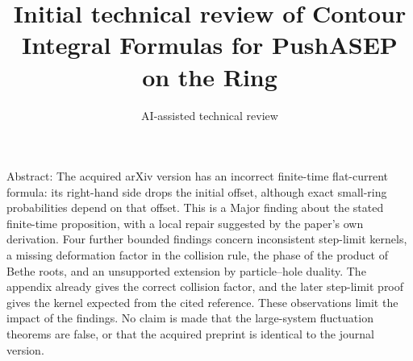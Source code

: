 \documentclass[10pt]{article}
\title{Initial technical review of
Contour Integral Formulas for PushASEP on the Ring}
\author{AI-assisted technical review}
\date{}
\begin{document}
\maketitle
Abstract: The acquired arXiv version has an incorrect finite-time flat-current formula: its right-hand side drops the initial offset, although exact small-ring probabilities depend on that offset. This is a Major finding about the stated finite-time proposition, with a local repair suggested by the paper’s own derivation. Four further bounded findings concern inconsistent step-limit kernels, a missing deformation factor in the collision rule, the phase of the product of Bethe roots, and an unsupported extension by particle–hole duality. The appendix already gives the correct collision factor, and the later step-limit proof gives the kernel expected from the cited reference. These observations limit the impact of the findings. No claim is made that the large-system fluctuation theorems are false, or that the acquired preprint is identical to the journal version.\par
\end{document}
